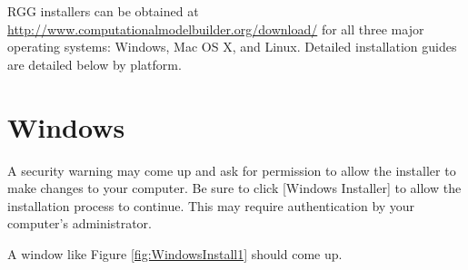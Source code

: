 RGG installers can be obtained at \url{http://www.computationalmodelbuilder.org/download/} for all three major operating systems: Windows, Mac OS X, and Linux.  Detailed installation guides are detailed below by platform.

\section{Windows}
A security warning may come up and ask for permission to allow the installer to make changes to your computer.  Be sure to click [Windows Installer] to allow the installation process to continue.  This may require authentication by your computer's administrator.

A window like Figure \ref{fig:WindowsInstall1} should come up.

